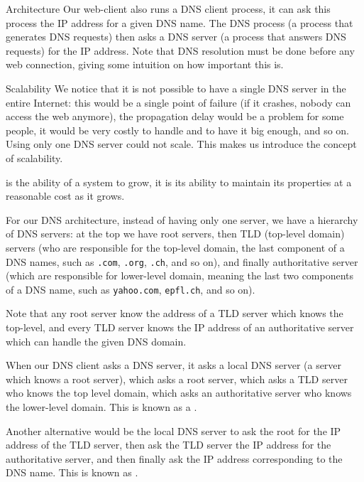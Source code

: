 \documentclass[a4paper]{article}
\begin{document}
\begin{parag}{Architecture}
    Our web-client also runs a DNS client process, it can ask this process the IP address for a given DNS name. The DNS process (a process that generates DNS requests) then asks a DNS server (a process that answers DNS requests) for the IP address. Note that DNS resolution must be done before any web connection, giving some intuition on how important this is.


    \begin{subparag}{Scalability}
        We notice that it is not possible to have a single DNS server in the entire Internet: this would be a single point of failure (if it crashes, nobody can access the web anymore), the propagation delay would be a problem for some people, it would be very costly to handle and to have it big enough, and so on. Using only one DNS server could not scale. This makes us introduce the concept of scalability.

         is the ability of a system to grow, it is its ability to maintain its properties at a reasonable cost as it grows. 

        For our DNS architecture, instead of having only one server, we have a hierarchy of DNS servers: at the top we have root servers, then TLD (top-level domain) servers (who are responsible for the top-level domain, the last component of a DNS names, such as \texttt{.com}, \texttt{.org}, \texttt{.ch}, and so on), and finally authoritative server (which are responsible for lower-level domain, meaning the last two components of a DNS name, such as \texttt{yahoo.com}, \texttt{epfl.ch}, and so on). 

        Note that any root server know the address of a TLD server which knows the top-level, and every TLD server knows the IP address of an authoritative server which can handle the given DNS domain.

        When our DNS client asks a DNS server, it asks a local DNS server (a server which knows a root server), which asks a root server, which asks a TLD server who knows the top level domain, which asks an authoritative server who knows the lower-level domain. This is known as a .

        Another alternative would be the local DNS server to ask the root for the IP address of the TLD server, then ask the TLD server the IP address for the authoritative server, and then finally ask the IP address corresponding to the DNS name. This is known as .


\end{subparag}
\end{parag}
\end{document}

